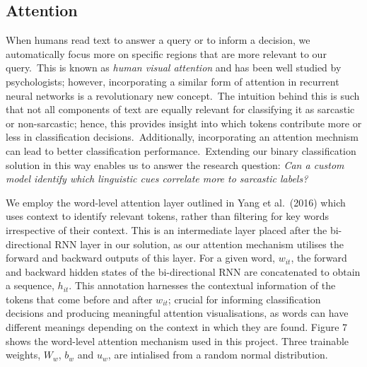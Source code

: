 \documentclass[12pt,a4paper]{article}
\begin{document}
	
	
	

\subsection{Attention}
\vspace{-4.2pt}
\noindent When humans read text to answer a query or to inform a decision, we automatically focus more on specific regions that are more relevant to our query.\ This is known as \textit{human visual attention} and has been well studied by psychologists; however, incorporating a similar form of attention in recurrent neural networks is a revolutionary new concept.\ The intuition behind this is such that not all components of text are equally relevant for classifying it as sarcastic or non-sarcastic; hence, this provides insight into which tokens contribute more or less in classification decisions.\ Additionally, incorporating an attention mechnism can lead to better classification performance.\ Extending our binary classification solution in this way enables us to answer the research question: \textit{Can a custom model identify which linguistic cues correlate more to sarcastic labels?}\\\vspace{-5pt}

\noindent We employ the word-level attention layer outlined in Yang et al.\ (2016) \cite{yang2016hierarchical} which uses context to identify relevant tokens, rather than filtering for key words irrespective of their context. This is an intermediate layer placed after the bi-directional RNN layer in our solution, as our attention mechanism utilises the forward and backward outputs of this layer. For a given word, $w_{it}$, the forward and backward hidden states of the bi-directional RNN are concatenated to obtain a sequence, $h_{it}$. This annotation harnesses the contextual information of the tokens that come before and after $w_{it}$; crucial for informing classification decisions and producing meaningful attention visualisations, as words can have different meanings depending on the context in which they are found. Figure 7 shows the word-level attention mechanism used in this project. Three trainable weights, $W_w$, $b_w$ and $u_w$, are intialised from a random normal distribution.\vspace{-10pt}
\end{document}

